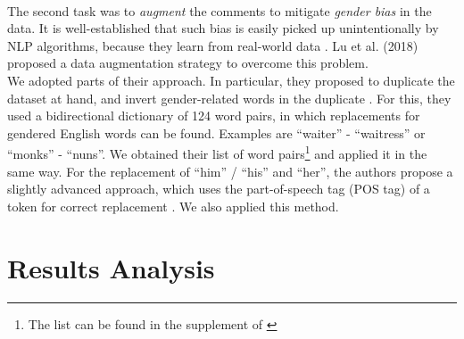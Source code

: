 \documentclass[11pt,a4paper]{article}
\begin{document}
\\
The second task was to \textit{augment} the comments to mitigate \textit{gender bias} in the data. It is well-established that such bias is easily picked up unintentionally by NLP algorithms, because they learn from real-world data \cite{Lu2018}. Lu et al. (2018) proposed a data augmentation strategy to overcome this problem. \\
We adopted parts of their approach. In particular, they proposed to duplicate the dataset at hand, and invert gender-related words in the duplicate \cite{Lu2018}. For this, they used a bidirectional dictionary of 124 word pairs, in which replacements for gendered English words can be found. Examples are ``waiter'' - ``waitress'' or ``monks'' - ``nuns''. We obtained their list of word pairs\footnote{The list can be found in the supplement of \cite{Lu2018}} and applied it in the same way. For the replacement of ``him'' / ``his'' and ``her'', the authors propose a slightly advanced approach, which uses the part-of-speech tag (POS tag) of a token for correct replacement \cite{Lu2018}. We also applied this method.
\section{Results Analysis}



\end{document}
